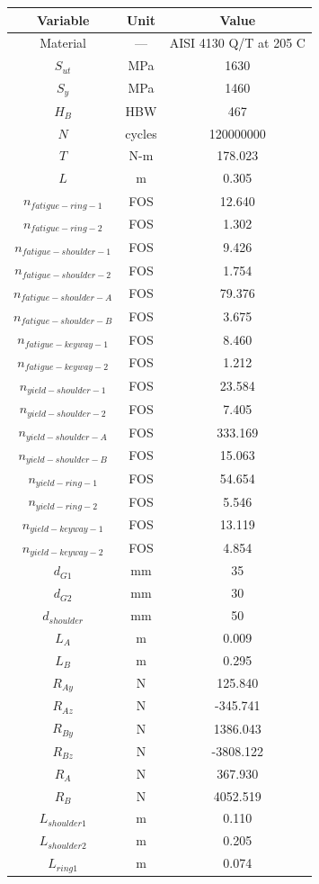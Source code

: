 \begin{tabular}{|c|c|c|}
\hline
Variable & Unit & Value \\ \hline

Material & --- & AISI 4130 Q/T at 205 C \\ \hline
$S_{ut}$ & MPa & 1630 \\ \hline
$S_{y}$ & MPa & 1460 \\ \hline
$H_B$ & HBW & 467 \\ \hline
$N$ & cycles & 120000000 \\ \hline
$T$ & N-m & 178.023 \\ \hline
$L$ & m & 0.305 \\ \hline
$n_{fatigue-ring-1}$ & FOS & 12.640 \\ \hline
$n_{fatigue-ring-2}$ & FOS & 1.302 \\ \hline
$n_{fatigue-shoulder-1}$ & FOS & 9.426 \\ \hline
$n_{fatigue-shoulder-2}$ & FOS & 1.754 \\ \hline
$n_{fatigue-shoulder-A}$ & FOS & 79.376 \\ \hline
$n_{fatigue-shoulder-B}$ & FOS & 3.675 \\ \hline
$n_{fatigue-keyway-1}$ & FOS & 8.460 \\ \hline
$n_{fatigue-keyway-2}$ & FOS & 1.212 \\ \hline
$n_{yield-shoulder-1}$ & FOS & 23.584 \\ \hline
$n_{yield-shoulder-2}$ & FOS & 7.405 \\ \hline
$n_{yield-shoulder-A}$ & FOS & 333.169 \\ \hline
$n_{yield-shoulder-B}$ & FOS & 15.063 \\ \hline
$n_{yield-ring-1}$ & FOS & 54.654 \\ \hline
$n_{yield-ring-2}$ & FOS & 5.546 \\ \hline
$n_{yield-keyway-1}$ & FOS & 13.119 \\ \hline
$n_{yield-keyway-2}$ & FOS & 4.854 \\ \hline
$d_{G1}$ & mm & 35 \\ \hline
$d_{G2}$ & mm & 30 \\ \hline
$d_{shoulder}$ & mm & 50 \\ \hline
$L_A$ & m & 0.009 \\ \hline
$L_B$ & m & 0.295 \\ \hline
$R_{Ay}$ & N & 125.840 \\ \hline
$R_{Az}$ & N & -345.741 \\ \hline
$R_{By}$ & N & 1386.043 \\ \hline
$R_{Bz}$ & N & -3808.122 \\ \hline
$R_A$ & N & 367.930 \\ \hline
$R_B$ & N & 4052.519 \\ \hline
$L_{shoulder1}$ & m & 0.110 \\ \hline
$L_{shoulder2}$ & m & 0.205 \\ \hline
$L_{ring1}$ & m & 0.074 \\ \hline

\end{tabular}
